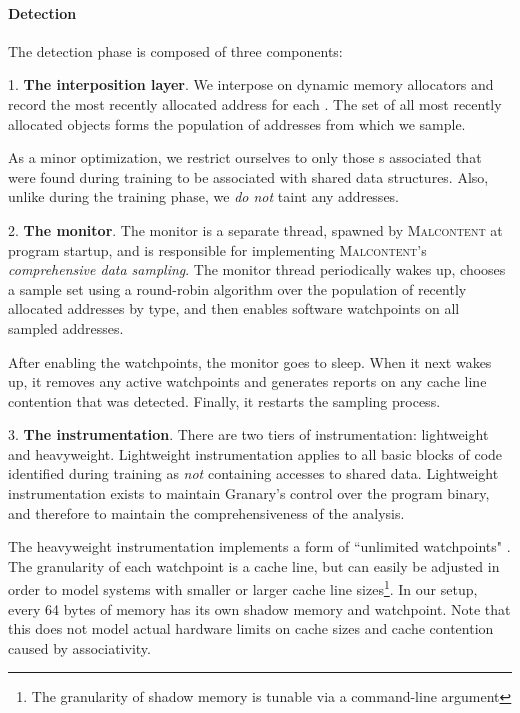 \documentclass[letterpaper,twocolumn,10pt]{article}
\newcommand{\TextToolname}{Malcontent}
\newcommand{\Toolname}{\textsc{\TextToolname{}}}
\begin{document}
\paragraph{Detection}

The detection phase is composed of three components: 

1. {\bf The interposition layer}. We interpose on dynamic memory allocators and record the most recently allocated
address for each \TypeId{}. The set of all most recently allocated objects forms the population of addresses from which
we sample.

As a minor optimization, we restrict ourselves to only those {\TypeId}s associated that were found during training
to be associated with shared data structures. Also, unlike during the training phase, we \emph{do not} taint any
addresses.

2.  {\bf The monitor}. The monitor is a separate thread, spawned by \Toolname{} at program startup, and is responsible
for implementing \Toolname's \emph{comprehensive data sampling}. The monitor thread periodically
wakes up, chooses a sample set using a round-robin algorithm over the population of recently allocated addresses by type, and
then enables software watchpoints on all sampled addresses.

After enabling the watchpoints, the monitor goes to sleep. When it next wakes up, it removes any active watchpoints
and generates reports on any cache line contention that was detected. Finally, it restarts the sampling process.

3. {\bf The instrumentation}. There are two tiers of instrumentation: lightweight and heavyweight. Lightweight
instrumentation applies to all basic blocks of code identified during training as \emph{not} containing accesses to shared
data. Lightweight instrumentation exists to maintain Granary's control over the program binary, and therefore to maintain
the comprehensiveness of the analysis.

The heavyweight instrumentation implements a form of ``unlimited watchpoints" \cite{UnlimitedWatchpoints}. The
granularity of each watchpoint is a cache line, but can easily be adjusted in order to model systems with smaller or
larger cache line sizes\footnote{The granularity of shadow memory is tunable via a command-line argument}.
In our setup, every 64 bytes of memory has its own shadow memory and watchpoint. Note that
this does not model actual hardware limits on cache sizes and cache contention caused by associativity.
\end{document}
